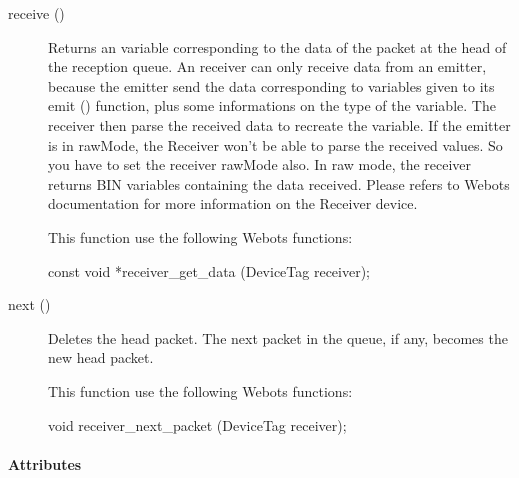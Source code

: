 \noindent
\begin{description}
\item[{receive ()}] Returns an \urbi variable corresponding to the
  data of the packet at the head of the reception queue. An \urbi
  receiver can only receive data from an \urbi emitter, because the
  \urbi emitter send the data corresponding to \urbi variables given
  to its emit () function, plus some informations on the type of the
  variable. The receiver then parse the received data to recreate the
  \urbi variable.  If the \urbi emitter is in rawMode, the Receiver
  won't be able to parse the received values.  So you have to set the
  receiver rawMode also. In raw mode, the receiver returns BIN
  variables containing the data received.  Please refers to Webots
  documentation for more information on the Receiver device.

  This function use the following Webots functions:

\begin{cxx}
const void *receiver_get_data  (DeviceTag receiver);
\end{cxx}

\item[{next ()}] Deletes the head packet. The next packet in the
  queue, if any, becomes the new head packet.

  This function use the following Webots functions:

\begin{cxx}
void receiver_next_packet  (DeviceTag receiver);
\end{cxx}
\end{description}

\paragraph{Attributes}

